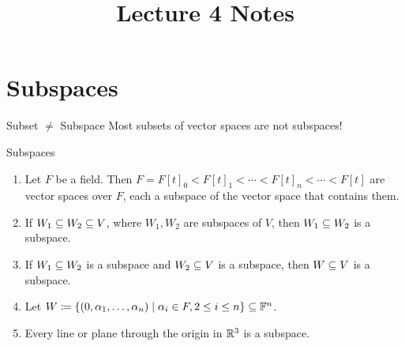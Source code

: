 \documentclass[class=article, crop=false]{standalone}
\title{Lecture 4 Notes}
\begin{document}
  \maketitle
  \newpage
  \section{Subspaces}
  \begin{note}{Subset $\neq$ Subspace}
    Most subsets of vector spaces are not subspaces!
  \end{note}
  \begin{example}{Subspaces}
    \begin{enumerate}
      \item Let $F$ be a field. Then $F = F[t]_0 < F[t]_1 < \dotsb < F[t]_n < \dotsb < F[t]$ are vector spaces over $F$, each a subspace of the vector space that contains them.
      \item If $W_1 \subseteq W_2 \subseteq V$, where $W_1, W_2$ are subspaces of $V$, then $W_1 \subseteq W_2$ is a subspace.
      \item If $W_1 \subseteq W_2$ is a subspace and $W_2 \subseteq V$ is a subspace, then $W \subseteq V$ is a subspace.
      \item Let $W\coloneqq \left\{(0, \alpha_1, \dotsc, \alpha_n)\mid \alpha_i \in F, 2 \leq i \leq n\right\} \subseteq \mathbb{F}^n$.
      \item Every line or plane through the origin in $\mathbb{R}^3$ is a subspace.
    \end{enumerate}
  \end{example}
\end{document}
